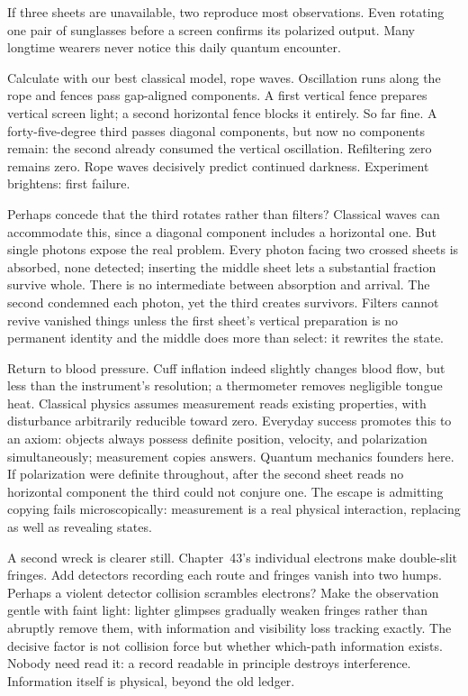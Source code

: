 If three sheets are unavailable, two reproduce most observations. Even rotating one pair of sunglasses before a screen confirms its polarized output. Many longtime wearers never notice this daily quantum encounter.


Calculate with our best classical model, rope waves. Oscillation runs along the rope and fences pass gap-aligned components. A first vertical fence prepares vertical screen light; a second horizontal fence blocks it entirely. So far fine. A forty-five-degree third passes diagonal components, but now no components remain: the second already consumed the vertical oscillation. Refiltering zero remains zero. Rope waves decisively predict continued darkness. Experiment brightens: first failure.

Perhaps concede that the third rotates rather than filters? Classical waves can accommodate this, since a diagonal component includes a horizontal one. But single photons expose the real problem. Every photon facing two crossed sheets is absorbed, none detected; inserting the middle sheet lets a substantial fraction survive whole. There is no intermediate between absorption and arrival. The second condemned each photon, yet the third creates survivors. Filters cannot revive vanished things unless the first sheet's vertical preparation is no permanent identity and the middle does more than select: it rewrites the state.

Return to blood pressure. Cuff inflation indeed slightly changes blood flow, but less than the instrument's resolution; a thermometer removes negligible tongue heat. Classical physics assumes measurement reads existing properties, with disturbance arbitrarily reducible toward zero. Everyday success promotes this to an axiom: objects always possess definite position, velocity, and polarization simultaneously; measurement copies answers. Quantum mechanics founders here. If polarization were definite throughout, after the second sheet reads no horizontal component the third could not conjure one. The escape is admitting copying fails microscopically: measurement is a real physical interaction, replacing as well as revealing states.

A second wreck is clearer still. Chapter~43's individual electrons make double-slit fringes. Add detectors recording each route and fringes vanish into two humps. Perhaps a violent detector collision scrambles electrons? Make the observation gentle with faint light: lighter glimpses gradually weaken fringes rather than abruptly remove them, with information and visibility loss tracking exactly. The decisive factor is not collision force but whether which-path information exists. Nobody need read it: a record readable in principle destroys interference. Information itself is physical, beyond the old ledger.

